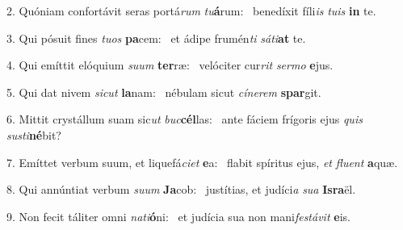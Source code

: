 2. Quóniam confortávit seras portá\textit{rum} \textit{tu}\textbf{á}rum: \ast\  benedíxit fíli\textit{is} \textit{tu}\textit{is} \textbf{in} te.\

3. Qui pósuit fines \textit{tu}\textit{os} \textbf{pa}cem: \ast\  et ádipe frumén\textit{ti} \textit{sá}\textit{ti}\textbf{at} te.\

4. Qui emíttit elóquium \textit{su}\textit{um} \textbf{ter}ræ: \ast\  velóciter cur\textit{rit} \textit{ser}\textit{mo} \textbf{e}jus.\

5. Qui dat nivem \textit{sic}\textit{ut} \textbf{la}nam: \ast\  nébulam sicut \textit{cí}\textit{ne}\textit{rem} \textbf{spar}git.\

6. Mittit crystállum suam sic\textit{ut} \textit{buc}\textbf{cél}las: \ast\  ante fáciem frígoris ejus \textit{quis} \textit{sus}\textit{ti}\textbf{né}bit?\

7. Emíttet verbum suum, et liquefá\textit{ci}\textit{et} \textbf{e}a: \ast\  flabit spíritus ejus, \textit{et} \textit{flu}\textit{ent} \textbf{a}quæ.\

8. Qui annúntiat verbum \textit{su}\textit{um} \textbf{Ja}cob: \ast\  justítias, et judíci\textit{a} \textit{su}\textit{a} \textbf{Is}\textbf{ra}ël.\

9. Non fecit táliter omni \textit{na}\textit{ti}\textbf{ó}ni: \ast\  et judícia sua non mani\textit{fes}\textit{tá}\textit{vit} \textbf{e}is.\

